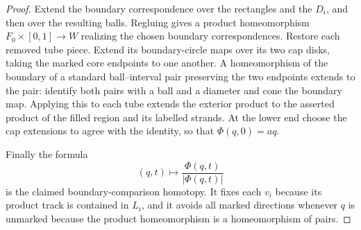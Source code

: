 \documentclass[11pt]{article}
\numberwithin{equation}{section}
\theoremstyle{definition}
\theoremstyle{remark}
\begin{document}
\begin{proof}
Extend the boundary correspondence over the rectangles and the
$D_i$, and then over the resulting balls.  Regluing gives a product
homeomorphism $F_0\times[0,1]\to W$ realizing the chosen boundary
correspondences.  Restore each removed tube piece.  Extend its
boundary-circle maps over its two cap disks, taking the marked core
endpoints to one another.  A homeomorphism of the boundary of a
standard ball--interval pair preserving the two endpoints extends to
the pair: identify both pairs with a ball and a diameter and cone the
boundary map.  Applying this to each tube extends the exterior
product to the asserted product of the filled region and its labelled
strands.  At the lower end choose the cap extensions to agree with
the identity, so that $\Phi(q,0)=a q$.

Finally the formula
\[
 (q,t)\longmapsto\frac{\Phi(q,t)}{|\Phi(q,t)|}
\]
is the claimed boundary-comparison homotopy.  It fixes each $v_i$
because its product track is contained in $L_i$, and it avoids all
marked directions whenever $q$ is unmarked because the product
homeomorphism is a homeomorphism of pairs.
\end{proof}
\end{document}
